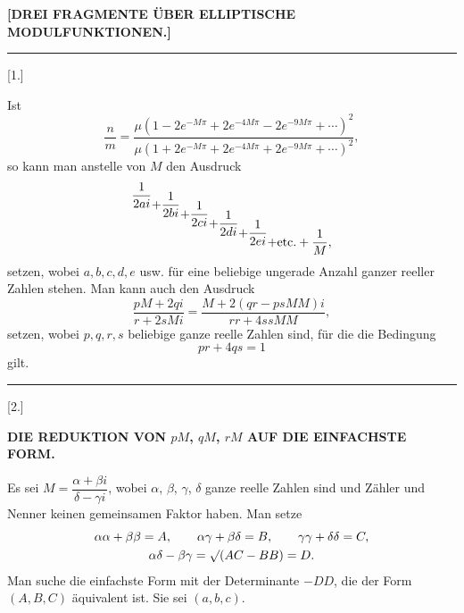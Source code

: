 \begin{center}\textbf{[DREI FRAGMENTE ÜBER ELLIPTISCHE MODULFUNKTIONEN.]}\end{center}
\begin{center}\rule{1.5cm}{.4pt}\end{center}
\begin{center}[1.]\end{center}

Ist
\[
\frac{n}{m}=\frac{\mu(1-2e^{-M\pi}+2e^{-4M\pi}-2e^{-9M\pi}+\cdots)^2}{\mu(1+2e^{-M\pi}+2e^{-4M\pi}+2e^{-9M\pi}+\cdots)^2},
\]
so kann man anstelle von $M$ den Ausdruck
\[
\frac{1}{2ai}\StepDown{.75}{+\frac{1}{2bi}}\StepDown{1.5}{+\frac{1}{2ci}}\StepDown{2.25}{+\frac{1}{2di}}\StepDown{3}{+\frac{1}{2ei}}\StepDown{3.75}{+\text{etc.}+\frac{1}{M},}
\]
setzen, wobei $a,b,c,d,e$ usw. für eine beliebige ungerade Anzahl ganzer reeller Zahlen stehen. Man kann auch den Ausdruck
\[
\frac{pM+2qi}{r+2sMi}=\frac{M+2(qr-psMM)i}{rr+4ssMM},
\]
setzen, wobei $p,q,r,s$ beliebige ganze reelle Zahlen sind, für die die Bedingung
\[
pr+4qs=1
\]
gilt.

\begin{center}\rule{3cm}{.4pt}\end{center}
\begin{center}[2.]\end{center}
\begin{center}\textbf{DIE REDUKTION VON $pM$, $qM$, $rM$ AUF DIE EINFACHSTE FORM.}\end{center}

Es sei $M=\dfrac{\alpha+\beta i}{\delta-\gamma i}$, wobei $\alpha$, $\beta$, $\gamma$, $\delta$ ganze reelle Zahlen sind und Zähler und Nenner keinen gemeinsamen Faktor haben. Man setze
\[
\begin{gathered}
\alpha\alpha+\beta\beta=A,\qquad \alpha\gamma+\beta\delta=B,\qquad \gamma\gamma+\delta\delta=C,\\
\alpha\delta-\beta\gamma=\mathord{\surd}(AC-BB)=D.
\end{gathered}
\]
Man suche die einfachste Form mit der Determinante $-DD$, die der Form $(A,B,C)$ äquivalent ist. Sie sei $(a,b,c)$.

